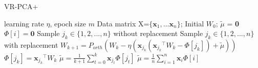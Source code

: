 \documentclass[conference]{IEEEtran}
\begin{document}
 
   \begin{algorithm}[t]
 	\caption{\textsc{VR-PCA+}}
 	\label{VR-PCA+}
	\begin{algorithmic}[1]
	\Require learning rate $\eta$, epoch size $m$
	\Input Data matrix X=$\{\mathbf{x}_1, ... \mathbf{x}_n\}$; Initial $W_0$; $\tilde{\mu}$ = \textbf{0}
		\State $\Phi[i] = \textbf{0}$
	\EndFor
		\State Sample $j_k \in \{1, 2, ... ,n\}$ without replacement
		\Else
		\State Sample $j_k \in \{1, 2, ... ,n\}$ with replacement
		\EndIf
		\State $W_{k+1} = P_{orth}(W_k - \eta(\mathbf{x}_{j_k}({\mathbf{x}_{j_k}}^{\top}W_k - \Phi[{j_k}]) + \tilde{\mu}))$
		\State $\Phi[{j_k}] = {\mathbf{x}_{j_k}}^{\top}W_k$
		\State $\tilde{\mu} = \frac{1}{k+1} \sum\limits_{t=0}^{k}\mathbf{x}_{j_t}\Phi[j_t]$
		\Else
		\State $\tilde{\mu} = \frac{1}{n} \sum\limits_{i=1}^{n}\mathbf{x}_{i}\Phi[i]$
		\EndIf
	\EndFor
	\end{algorithmic}
\end{algorithm}
 
\end{document}
